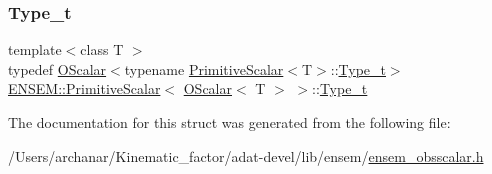 \subsubsection{\texorpdfstring{Type\_t}{Type\_t}\hspace{0.1cm}{\footnotesize\ttfamily [3/3]}}
{\footnotesize\ttfamily template$<$class T $>$ \\
typedef \mbox{\hyperlink{classENSEM_1_1OScalar}{O\+Scalar}}$<$typename \mbox{\hyperlink{structENSEM_1_1PrimitiveScalar}{Primitive\+Scalar}}$<$T$>$\+::\mbox{\hyperlink{structENSEM_1_1PrimitiveScalar_3_01OScalar_3_01T_01_4_01_4_a04f9a62c0498189e4c514dce6a7baa36}{Type\+\_\+t}}$>$ \mbox{\hyperlink{structENSEM_1_1PrimitiveScalar}{E\+N\+S\+E\+M\+::\+Primitive\+Scalar}}$<$ \mbox{\hyperlink{classENSEM_1_1OScalar}{O\+Scalar}}$<$ T $>$ $>$\+::\mbox{\hyperlink{structENSEM_1_1PrimitiveScalar_3_01OScalar_3_01T_01_4_01_4_a04f9a62c0498189e4c514dce6a7baa36}{Type\+\_\+t}}}



The documentation for this struct was generated from the following file\+:\begin{DoxyCompactItemize}
\item 
/\+Users/archanar/\+Kinematic\+\_\+factor/adat-\/devel/lib/ensem/\mbox{\hyperlink{adat-devel_2lib_2ensem_2ensem__obsscalar_8h}{ensem\+\_\+obsscalar.\+h}}\end{DoxyCompactItemize}
